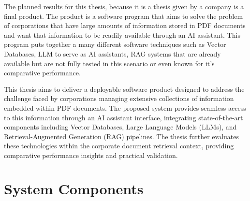 \label{chapter:Planned Results}
The planned results for this thesis, because it is a thesis given by a company is a final product. The product is a software program that aims to solve the problem of corporations that have large amounts of information stored in PDF documents and want that information to be readily available through an AI assistant. This program puts together a many different software techniques such as Vector Databases, \ac{LLM} to serve as AI assistants, \gls{RAG} systems that are already available but are not fully tested in this scenario or even known for it's comparative performance. 

This thesis aims to deliver a deployable software product designed to address the challenge faced by corporations managing extensive collections of information embedded within PDF documents. The proposed system provides seamless access to this information through an AI assistant interface, integrating state-of-the-art components including Vector Databases, Large Language Models (LLMs), and Retrieval-Augmented Generation (RAG) pipelines. The thesis further evaluates these technologies within the corporate document retrieval context, providing comparative performance insights and practical validation. 

\section{System Components}


